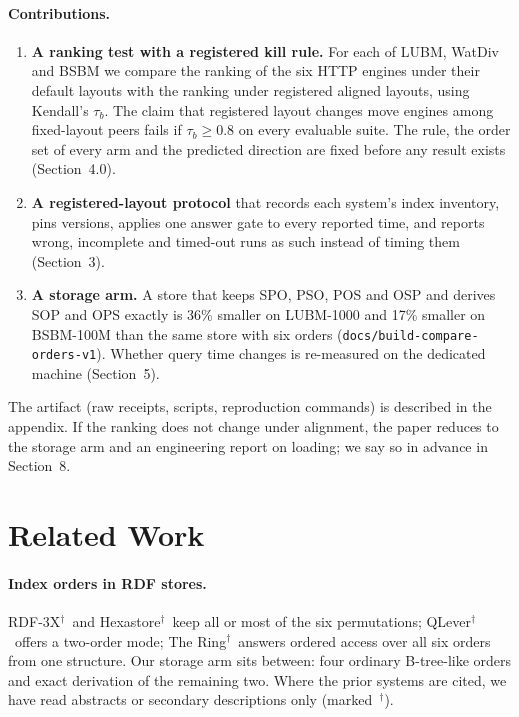 \documentclass[11pt]{article}
\newcommand{\unread}{$^{\dagger}$}
\begin{document}
\paragraph{Contributions.}
\begin{enumerate}
  \item \textbf{A ranking test with a registered kill rule.} For each of LUBM, WatDiv and BSBM we compare the ranking of the six
  HTTP engines under their default layouts with the ranking under registered aligned layouts, using Kendall's $\tau_b$. The
  claim that registered layout changes move engines among fixed-layout peers fails if $\tau_b \ge 0.8$ on every evaluable suite. The rule, the order set of every arm and the predicted
  direction are fixed before any result exists (Section~4.0).
  \item \textbf{A registered-layout protocol} that records each system's index inventory, pins versions, applies one answer gate
  to every reported time, and reports wrong, incomplete and timed-out runs as such instead of timing them
  (Section~3).
  \item \textbf{A storage arm.} A store that keeps SPO, PSO, POS and OSP and derives SOP and OPS exactly is
  36\% smaller on LUBM-1000 and 17\% smaller on BSBM-100M than the same store with six orders
  (\texttt{docs/build-compare-orders-v1}). Whether query time changes is re-measured on the dedicated machine (Section~5).
\end{enumerate}
The artifact (raw receipts, scripts, reproduction commands) is described in the appendix. If the ranking does not change under
alignment, the paper reduces to the storage arm and an engineering report on loading; we say so in advance in Section~8.

\section{Related Work}
\paragraph{Index orders in RDF stores.} RDF-3X\unread\ and Hexastore\unread\ keep all or most of the six permutations;
QLever\unread\ offers a two-order mode; The Ring\unread\ answers ordered access over all six orders from one structure.
Our storage arm sits between: four ordinary B-tree-like orders and exact derivation of the remaining two. Where the prior systems are
cited, we have read abstracts or secondary descriptions only (marked~\unread).
\end{document}
